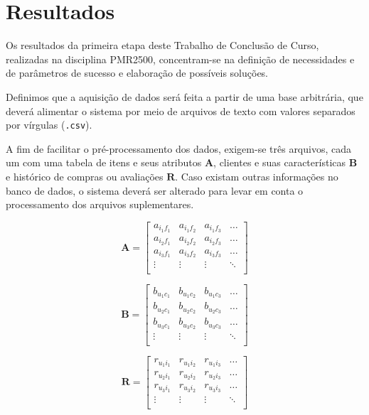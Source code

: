 \chapter[Resultados]{Resultados}
\label{chap:resultados}

Os resultados da primeira etapa deste Trabalho de Conclusão de Curso, realizadas na disciplina PMR2500, concentram-se na definição de necessidades e de parâmetros de sucesso e elaboração de possíveis soluções. 

Definimos que a aquisição de dados será feita a partir de uma base arbitrária, que deverá alimentar o sistema por meio de arquivos de texto com valores separados por vírgulas (\texttt{.csv}).

A fim de facilitar o pré-processamento dos dados, exigem-se três arquivos, cada um com uma tabela de itens e seus atributos $\mathbf{A}$, clientes e suas características $\mathbf{B}$ e histórico de compras ou avaliações $\mathbf{R}$. Caso existam outras informações no banco de dados, o sistema deverá ser alterado para levar em conta o processamento dos arquivos suplementares.

\begin{equation} 
\mathbf{A} = 
\begin{bmatrix} 
 a_{i_1 f_1} &  a_{i_1 f_2} &  a_{i_1 f_3}  & \dots   \\
 a_{i_2 f_1} &  a_{i_2 f_2} &  a_{i_2 f_3}  & \dots   \\
 a_{i_3 f_1} &  a_{i_3 f_2} &  a_{i_3 f_3}  & \dots  \\ 
 \vdots &  \vdots &  \vdots  & \ddots   \\
 \end{bmatrix}
\end{equation}

\begin{equation}
	\mathbf{B} = 
\begin{bmatrix} 
 b_{u_1 c_1} &  b_{u_1 c_2} &  b_{u_1 c_3}  & \dots   \\
 b_{u_2 c_1} &  b_{u_2 c_2} &  b_{u_2 c_3}  & \dots   \\
 b_{u_3 c_1} &  b_{u_3 c_2} &  b_{u_3 c_3}  & \dots  \\ 
 \vdots &  \vdots &  \vdots  & \ddots   \\
 \end{bmatrix}
\end{equation}

\begin{equation}
	  \mathbf{R} = 
\begin{bmatrix} 
  r_{u_1 i_1} &  r_{u_1 i_2} &  r_{u_1 i_3}  & \dots   \\
 r_{u_2 i_1} &  r_{u_2 i_2} &  r_{u_2 i_3}  & \dots   \\
 r_{u_3 i_1} &  r_{u_3 i_2} &  r_{u_3 i_3}  & \dots  \\ 
 \vdots &  \vdots &  \vdots  & \ddots   \\
\end{bmatrix}
\end{equation}

